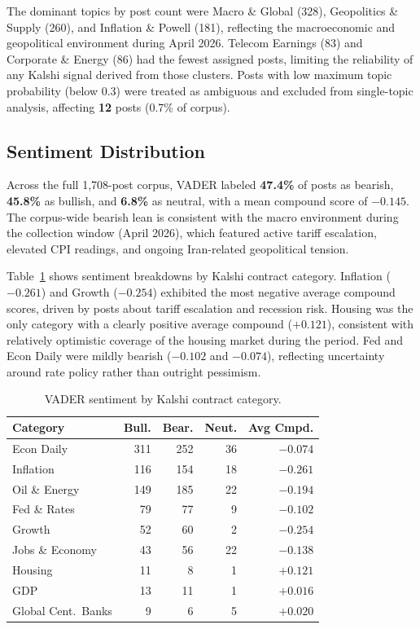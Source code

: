 \documentclass[sigconf]{acmart}
\begin{document}
The dominant topics by post count were Macro \& Global (328), Geopolitics \& Supply (260), and Inflation \& Powell (181), reflecting the macroeconomic and geopolitical environment during April 2026. Telecom Earnings (83) and Corporate \& Energy (86) had the fewest assigned posts, limiting the reliability of any Kalshi signal derived from those clusters. Posts with low maximum topic probability (below 0.3) were treated as ambiguous and excluded from single-topic analysis, affecting \textbf{12} posts (0.7\% of corpus).

\subsection{Sentiment Distribution}

Across the full 1,708-post corpus, VADER labeled \textbf{47.4\%} of posts as bearish, \textbf{45.8\%} as bullish, and \textbf{6.8\%} as neutral, with a mean compound score of \textbf{$-0.145$}. The corpus-wide bearish lean is consistent with the macro environment during the collection window (April 2026), which featured active tariff escalation, elevated CPI readings, and ongoing Iran-related geopolitical tension.

Table~\ref{tab:sentiment} shows sentiment breakdowns by Kalshi contract category. Inflation ($-0.261$) and Growth ($-0.254$) exhibited the most negative average compound scores, driven by posts about tariff escalation and recession risk. Housing was the only category with a clearly positive average compound ($+0.121$), consistent with relatively optimistic coverage of the housing market during the period. Fed and Econ Daily were mildly bearish ($-0.102$ and $-0.074$), reflecting uncertainty around rate policy rather than outright pessimism.

\begin{table}[h]
\caption{VADER sentiment by Kalshi contract category.}
\label{tab:sentiment}
\begin{tabular}{lrrrr}
\toprule
\textbf{Category} & \textbf{Bull.} & \textbf{Bear.} & \textbf{Neut.} & \textbf{Avg Cmpd.} \\
\midrule
Econ Daily          & 311 & 252 & 36 & $-0.074$ \\
Inflation           & 116 & 154 & 18 & $-0.261$ \\
Oil \& Energy       & 149 & 185 & 22 & $-0.194$ \\
Fed \& Rates        &  79 &  77 &  9 & $-0.102$ \\
Growth              &  52 &  60 &  2 & $-0.254$ \\
Jobs \& Economy     &  43 &  56 & 22 & $-0.138$ \\
Housing             &  11 &   8 &  1 & $+0.121$ \\
GDP                 &  13 &  11 &  1 & $+0.016$ \\
Global Cent.\ Banks &   9 &   6 &  5 & $+0.020$ \\
\bottomrule
\end{tabular}
\end{table}
\end{document}
